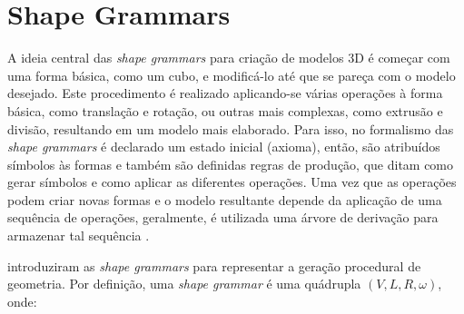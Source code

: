 \begin{figure}[h!]
	\centering
	\captionsetup{width=15cm}
	{}	
\end{figure}

\section{Shape Grammars}
\label{sec:shape_grammars}

A ideia central das \textit{shape grammars} para criação de modelos 3D é começar com uma forma básica, como um cubo, e modificá-lo até que se pareça com o modelo desejado. Este procedimento é realizado aplicando-se várias operações à forma básica, como translação e rotação, ou outras mais complexas, como extrusão e divisão, resultando em um modelo mais elaborado. Para isso, no formalismo das \textit{shape grammars} é declarado um estado inicial (axioma), então, são atribuídos símbolos às formas e também são definidas regras de produção, que ditam como gerar símbolos e como aplicar as diferentes operações. Uma vez que as operações podem criar novas formas e o modelo resultante depende da aplicação de uma sequência de operações, geralmente, é utilizada uma árvore de derivação para armazenar tal sequência \cite{haubenwallner2016}.

 introduziram as \textit{shape grammars} para representar a geração procedural de geometria. Por definição, uma \textit{shape grammar} é uma quádrupla $(V, L, R, \omega)$, onde:

